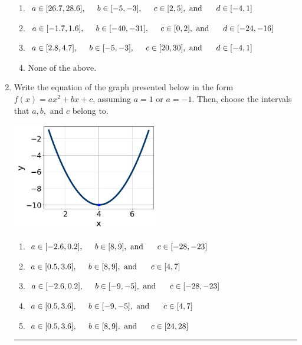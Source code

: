 \documentclass[14pt]{extbook}
\newcommand{\litem}[1]{\item#1\hspace*{-1cm}\rule{\textwidth}{0.4pt}}
\begin{document}
\begin{enumerate}
{\begin{enumerate}[label=\Alph*.]
\item \( a \in [26.7, 28.6], \hspace*{5mm} b \in [-5, -3], \hspace*{5mm} c \in [2, 5], \text{ and } \hspace*{5mm} d \in [-4, 1] \)
\item \( a \in [-1.7, 1.6], \hspace*{5mm} b \in [-40, -31], \hspace*{5mm} c \in [0, 2], \text{ and } \hspace*{5mm} d \in [-24, -16] \)
\item \( a \in [2.8, 4.7], \hspace*{5mm} b \in [-5, -3], \hspace*{5mm} c \in [20, 30], \text{ and } \hspace*{5mm} d \in [-4, 1] \)
\item \( \text{None of the above.} \)

\end{enumerate} }
\litem{
Write the equation of the graph presented below in the form $f(x)=ax^2+bx+c$, assuming  $a=1$ or $a=-1$. Then, choose the intervals that $a, b,$ and $c$ belong to.
\begin{center}
    \includegraphics[width=0.5\textwidth]{../Figures/quadraticGraphToEquationCopyC.png}
\end{center}
\begin{enumerate}[label=\Alph*.]
\item \( a \in [-2.6, 0.2], \hspace*{5mm} b \in [8, 9], \text{ and } \hspace*{5mm} c \in [-28, -23] \)
\item \( a \in [0.5, 3.6], \hspace*{5mm} b \in [8, 9], \text{ and } \hspace*{5mm} c \in [4, 7] \)
\item \( a \in [-2.6, 0.2], \hspace*{5mm} b \in [-9, -5], \text{ and } \hspace*{5mm} c \in [-28, -23] \)
\item \( a \in [0.5, 3.6], \hspace*{5mm} b \in [-9, -5], \text{ and } \hspace*{5mm} c \in [4, 7] \)
\item \( a \in [0.5, 3.6], \hspace*{5mm} b \in [8, 9], \text{ and } \hspace*{5mm} c \in [24, 28] \)


\end{enumerate}}
\end{enumerate}
\end{document}

